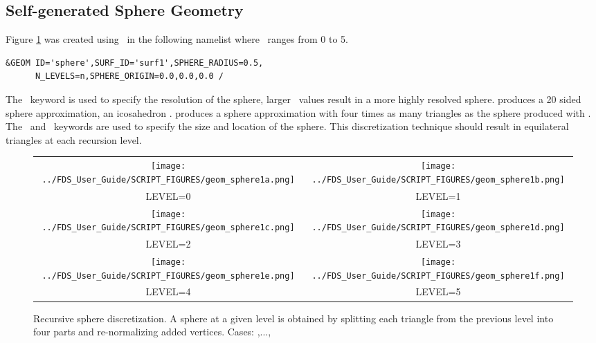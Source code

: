 \documentclass[11pt]{book}
\begin{document}
\FloatBarrier

\subsection{Self-generated Sphere Geometry}

Figure \ref{fig:geom_sphere} was created using \
in the following  namelist
where \ ranges from 0 to 5.
\begin{lstlisting}
&GEOM ID='sphere',SURF_ID='surf1',SPHERE_RADIUS=0.5,
      N_LEVELS=n,SPHERE_ORIGIN=0.0,0.0,0.0 /
\end{lstlisting}
The \ keyword is used to specify the resolution of the sphere, larger \ values result in a more highly resolved sphere. produces a 20 sided sphere approximation, an icosahedron .  produces a sphere approximation with four times as many triangles as the sphere produced with . The \ and \ keywords are used to specify the size and location of the sphere.  This discretization technique should result in equilateral triangles at each recursion level.

\begin{figure}
\begin{center}
\begin{tabular}{cc}
 \texttt{[image: ../FDS\_User\_Guide/SCRIPT\_FIGURES/geom\_sphere1a.png]}&
 \texttt{[image: ../FDS\_User\_Guide/SCRIPT\_FIGURES/geom\_sphere1b.png]}\\
 LEVEL=0&LEVEL=1\\
 \texttt{[image: ../FDS\_User\_Guide/SCRIPT\_FIGURES/geom\_sphere1c.png]}&
 \texttt{[image: ../FDS\_User\_Guide/SCRIPT\_FIGURES/geom\_sphere1d.png]}\\
 LEVEL=2&LEVEL=3\\
 \texttt{[image: ../FDS\_User\_Guide/SCRIPT\_FIGURES/geom\_sphere1e.png]}&
 \texttt{[image: ../FDS\_User\_Guide/SCRIPT\_FIGURES/geom\_sphere1f.png]}\\
 LEVEL=4&LEVEL=5\\
  \end{tabular}
\end{center}
 \caption[Recursive sphere discretization]{Recursive sphere discretization.  A sphere at a given level is
 obtained by splitting each triangle from the previous level into four parts and re-normalizing added vertices. Cases: ,...,}
\label{fig:geom_sphere}
\end{figure}
\end{document}
